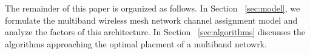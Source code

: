 The remainder of this paper is organized as follows. In Section ~\ref{sec:model}, we formulate the multiband wireless mesh network channel assignment model and analyze the factors of this architecture. 
In Section ~\ref{sec:algorithms} discusses the algorithms approaching the optimal placment of a multiband netowrk. 


